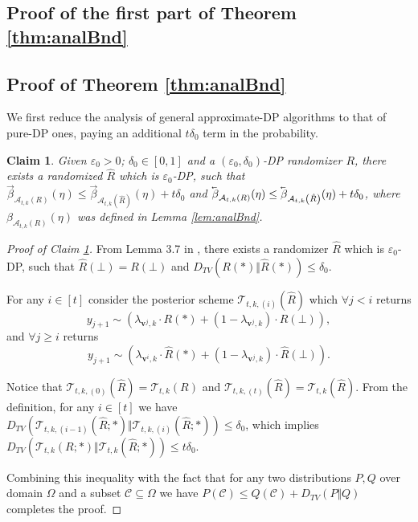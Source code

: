 \documentclass{article}
\newcommand{\mainThmAsym}{thm:analBnd}
\newcommand{\mainThmAsym}{thm:asymBnd}
\theoremstyle{plain}
\newtheorem{claim}[theorem]{Claim}
\theoremstyle{definition}
\newcommand{\eps}{\varepsilon}
\newcommand{\lvec}[1]{\reflectbox{$\vec{\reflectbox{$#1$}}$}}
\newcommand{\out}{y}
\newcommand{\rand}{R}
\newcommand{\view}{\boldsymbol{v}}
\newcommand{\alloc}[2]{\mathcal{A}_{#1}\left(#2\right)}
\newcommand{\post}[2]{\mathcal{T}_{#1}\left(#2\right)}
\newcommand{\postFunc}[3]{\mathcal{T}_{#1}\left(#2; #3\right)}
\newcommand{\add}[1]{\lvec{#1}}
\newcommand{\rem}[1]{\vec{#1}}
\begin{document}
\subsection{Proof of the first part of Theorem \ref{\mainThmAsym}}
\else
\subsection{Proof of Theorem \ref{\mainThmAsym}}
\fi

We first reduce the analysis of general approximate-DP algorithms to that of pure-DP ones, paying an additional $t \delta_{0}$ term in the probability.
\begin{claim}\label{clm:approxToPure}
    Given $\eps_{0} > 0$; $\delta_{0} \in [0, 1]$ and a $(\eps_{0}, \delta_{0})$-DP randomizer $\rand$, there exists a randomized $\hat{\rand}$ which is $\eps_{0}$-DP, such that $\rem{\beta}_{\alloc{t, k}{\rand}}(\eta) \le \rem{\beta}_{\alloc{t, k}{\hat{\rand}}}(\eta) + t \delta_{0}$ and $\add{\beta}_{\alloc{t, k}{\rand}}(\eta) \le \add{\beta}_{\alloc{t, k}{\hat{\rand}}}(\eta) + t \delta_{0}$, where $\beta_{\alloc{t, k}{\rand}}(\eta)$ was defined in Lemma \ref{lem:analBnd}.
\end{claim}

\begin{proof}[Proof of Claim \ref{clm:approxToPure}]
    From Lemma 3.7 in \citep{FMT21}, there exists a randomizer $\hat{\rand}$ which is $\eps_{0}$-DP, such that $\hat{\rand}(\bot) = \rand(\bot)$ and $D_{TV}(\rand(*) \Vert \hat{\rand}(*)) \le \delta_{0}$.
    
    For any $i \in [t]$ consider the posterior scheme $\post{t, k, (i)}{\hat{\rand}}$ which $\forall j < i$ returns 
    \[
        \out_{j+1} \sim \left(\lambda_{\view^{j}, k} \cdot \rand(*) + (1-\lambda_{\view^{j}, k}) \cdot \rand(\bot) \right), 
    \]
    and $\forall j \ge i$ returns
    \[
        \out_{j+1} \sim \left(\lambda_{\view^{i}, k} \cdot \hat{\rand}(*) + (1-\lambda_{\view^{j}, k}) \cdot \hat{\rand}(\bot) \right).
    \]
    
    Notice that $\post{t, k, (0)}{\hat{\rand}} = \post{t, k}{\rand}$ and $\post{t, k, (t)}{\hat{\rand}} = \post{t, k}{\hat{\rand}}$. From the definition, for any $i \in [t]$ we have $D_{TV}\left(\postFunc{t, k, (i-1)}{\hat{\rand}}{*} \Vert \postFunc{t, k, (i)}{\hat{\rand}}{*} \right) \le \delta_{0}$, which implies $D_{TV}\left(\postFunc{t, k}{\rand}{*} \Vert \postFunc{t, k}{\hat{\rand}}{*} \right) \le t \delta_{0}$.

    Combining this inequality with the fact that for any two distributions $P, Q$ over domain $\Omega$ and a subset $\mathcal{C} \subseteq \Omega$ we have $P(\mathcal{C}) \le Q(\mathcal{C}) + D_{TV}(P \Vert Q)$ completes the proof.
\end{proof}
\end{document}
